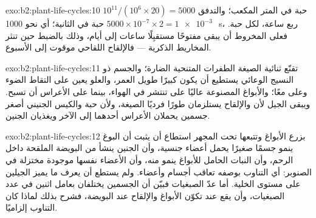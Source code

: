 \begin{solution}{exo:b2:plant-life-cycles:10}
$10^{11}/(10^{6}\times 20) = \num{5000}$ حبة في المتر المكعب؛ والتدفق
$5000\times 10^{-7}\times 2 = \qty{1e-3}{}$ حبة في الثانية؛ أي نحو
\qty{1000}{s}، ربع ساعة، لكل حبة. فعلى المخروط أن يبقى مفتوحًا
مستقبِلًا ساعات إلى أيام، وذلك بالضبط حين تنثر المخاريط الذكرية ---
فالإلقاح اللقاحي موقوت إلى الأسبوع.
\end{solution}

\begin{solution}{exo:b2:plant-life-cycles:11}
تقنّع ثنائية الصيغة الطفرات المتنحية الضارة؛ والجسم 
ذو النسيج الوعائي يستطيع أن يكون كبيرًا طويل العمر، والعلو يعين على
التقاط الضوء وعلى  معًا؛ والأبواغ المصنوعة عاليًا على
 تنتشر في الهواء، بينما على الأعراس أن تسبح. ويبقى الجيل
 لأن  والإلقاح يستلزمان طورًا فرديًا
الصيغة، ولأن حبة  والكيس الجنيني أصغر جسمين يحملان الأعراس
أحدهما إلى الآخر ويغذيان الجنين.
\end{solution}

\begin{solution}{exo:b2:plant-life-cycles:12}
بزرع الأبواغ وتتبعها تحت المجهر استطاع أن يثبت أن البوغ ينمو جسمًا
صغيرًا يحمل أعضاء جنسية، وأن الجنين ينشأ من البويضة الملقحة داخل
الرحم، وأن النبات الحامل للأبواغ ينمو منه، وأن الأعضاء نفسها موجودة
مختزلة في  الصنوبر: أي التناوب بوصفه تعاقب أجسام وأعضاء. ولم
يستطع أن يعرف ما يميز الجيلين على مستوى الخلية. أما عدّ الصبغيات
فبيّن أن الجسمين يختلفان بعامل اثنين في عدد الصبغيات، وأن  يقع عند تكوّن الأبواغ والإلقاح عند البويضة، فشرح بذلك لماذا
كان التناوب إلزاميًا.
\end{solution}

